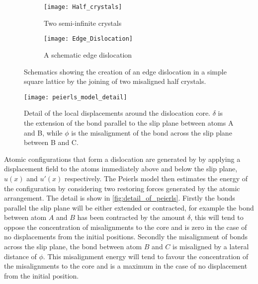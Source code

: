 \begin{figure}
\centering

    \begin{subfigure}{0.4\textwidth}
        \texttt{[image: Half\_crystals]}
        \caption{Two semi-infinite crystals \label{fig:semi_infinite_crystals}}
    \end{subfigure}

    \begin{subfigure}{0.4\textwidth}
        \texttt{[image: Edge\_Dislocation]}
        \caption{A schematic edge dislocation\label{fig:joined_half_crystals}}
    \end{subfigure}

    \caption[Building an edge dislocation.]{Schematics showing the creation of an edge dislocation in a simple square lattice by the joining of two misaligned half crystals. \label{fig:edge_disloc}}
\end{figure}

\begin{figure}
\centering
\texttt{[image: peierls\_model\_detail]}

\caption[Local displacements around an edge dislocation.]{Detail of the local displacements around the dislocation core. $\delta$ is the extension of the bond parallel to the slip plane between atoms A and B, while $\phi$ is the misalignment of the bond across the slip plane between B and C.\label{fig:detail_of_peierls}}
\end{figure}

Atomic configurations that form a dislocation are generated by by applying a displacement field to the atoms immediately above and below the slip plane, $u(x)$ and $u'(x)$ respectively. The Peierls model then estimates the energy of the configuration by considering two restoring forces generated by the atomic arrangement. The detail is show in \autoref{fig:detail_of_peierls}. Firstly the bonds parallel the slip plane will be either extended or contracted, for example the bond between atom $A$ and $B$ has been contracted by the amount $\delta$, this will tend to oppose the concentration of misalignments to the core and is zero in the case of no displacements from the initial positions. Secondly the misalignment of bonds across the slip plane, the bond between atom $B$ and $C$ is misaligned by a lateral distance of $\phi$. This misalignment energy will tend to favour the concentration of the misalignments to the core and is a maximum in the case of no displacement from the initial position.


